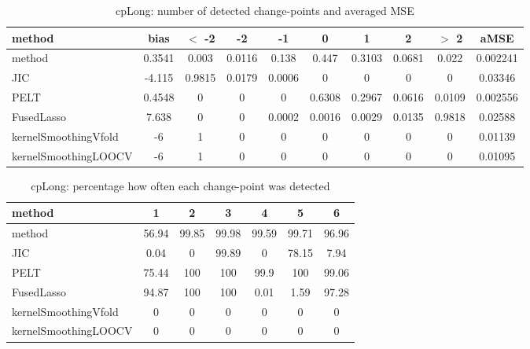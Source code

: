 \begin{table}[ht]
\centering
\begin{tabular}{l|c|ccccccc|c}
  \hline
method & bias & $<$ -2 & -2 & -1 & 0 & 1 & 2 & $>$ 2 & aMSE \\ 
  \hline
method & 0.3541 & 0.003 & 0.0116 & 0.138 & 0.447 & 0.3103 & 0.0681 & 0.022 & 0.002241 \\ 
  JIC & -4.115 & 0.9815 & 0.0179 & 0.0006 &     0 &     0 &     0 &     0 & 0.03346 \\ 
  PELT & 0.4548 &     0 &     0 &     0 & 0.6308 & 0.2967 & 0.0616 & 0.0109 & 0.002556 \\ 
  FusedLasso & 7.638 &     0 &     0 & 0.0002 & 0.0016 & 0.0029 & 0.0135 & 0.9818 & 0.02588 \\ 
  kernelSmoothingVfold &    -6 &     1 &     0 &     0 &     0 &     0 &     0 &     0 & 0.01139 \\ 
  kernelSmoothingLOOCV &    -6 &     1 &     0 &     0 &     0 &     0 &     0 &     0 & 0.01095 \\ 
   \hline
\end{tabular}
\caption{cpLong: number of detected change-points and averaged MSE} 
\label{tab:cpLongNjumps}
\end{table}
\begin{table}[ht]
\centering
\begin{tabular}{l|cccccc}
  \hline
method & 1 & 2 & 3 & 4 & 5 & 6 \\ 
  \hline
method &  56.94 &  99.85 &  99.98 &  99.59 &  99.71 &  96.96 \\ 
  JIC &   0.04 &      0 &  99.89 &      0 &  78.15 &   7.94 \\ 
  PELT &  75.44 &    100 &    100 &   99.9 &    100 &  99.06 \\ 
  FusedLasso &  94.87 &    100 &    100 &   0.01 &   1.59 &  97.28 \\ 
  kernelSmoothingVfold &      0 &      0 &      0 &      0 &      0 &      0 \\ 
  kernelSmoothingLOOCV &      0 &      0 &      0 &      0 &      0 &      0 \\ 
   \hline
\end{tabular}
\caption{cpLong: percentage how often each change-point was detected} 
\label{tab:cpLongDetections}
\end{table}
